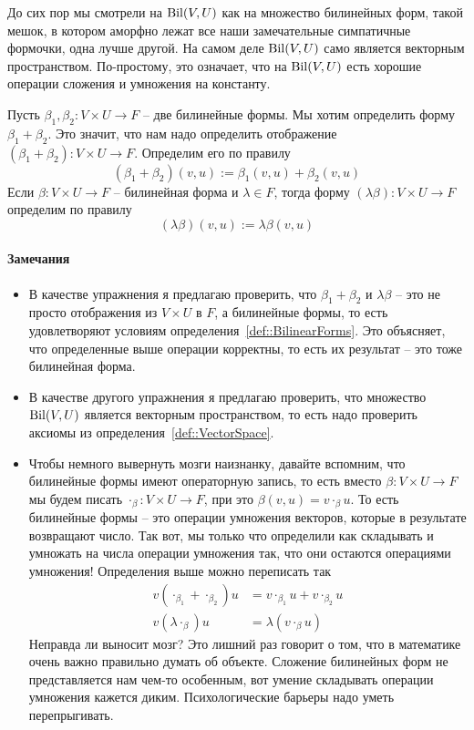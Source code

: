 До сих пор мы смотрели на $\operatorname{Bil}(V, U)$ как на множество билинейных форм, такой мешок, в котором аморфно лежат все наши замечательные симпатичные формочки, одна лучше другой.
На самом деле $\operatorname{Bil}(V, U)$ само является векторным пространством.
По-простому, это означает, что на $\operatorname{Bil}(V, U)$ есть хорошие операции сложения и умножения на константу.


\begin{definition}
Пусть $\beta_1,\beta_2\colon V\times U \to F$ -- две билинейные формы.
Мы хотим определить форму $\beta_1 + \beta_2$.
Это значит, что нам надо определить отображение $(\beta_1 + \beta_2)\colon V\times U \to F$.
Определим его по правилу
\[
(\beta_1 + \beta_2)(v, u) := \beta_1(v,u) + \beta_2(v,u)
\]
Если $\beta\colon V\times U \to F$ -- билинейная форма и $\lambda\in F$, тогда форму $(\lambda \beta)\colon V\times U \to F$ определим по правилу
\[
(\lambda\beta)(v, u) := \lambda \beta(v, u)
\]
\end{definition}

\paragraph{Замечания}

\begin{itemize}
\item В качестве упражнения я предлагаю проверить, что $\beta_1 + \beta_2$ и $\lambda\beta$ -- это не просто отображения из $V\times U$ в $F$, а билинейные формы, то есть удовлетворяют условиям определения~\ref{def::BilinearForms}.
Это объясняет, что определенные выше операции корректны, то есть их результат -- это тоже билинейная форма.

\item В качестве другого упражнения я предлагаю проверить, что множество $\operatorname{Bil}(V, U)$ является векторным пространством, то есть надо проверить аксиомы из определения~\ref{def::VectorSpace}.

\item Чтобы немного вывернуть мозги наизнанку, давайте вспомним, что билинейные формы имеют операторную запись, то есть вместо $\beta\colon V\times U\to F$ мы будем писать $\cdot_\beta\colon V\times U \to F$, при это $\beta(v, u) = v \cdot_\beta u$.
То есть билинейные формы -- это операции умножения векторов, которые в результате возвращают число.
Так вот, мы только что определили как складывать и умножать на числа операции умножения так, что они остаются операциями умножения!
Определения выше можно переписать так
\begin{align*}
v (\cdot_{\beta_1} + \cdot_{\beta_2}) u &= v \cdot_{\beta_1} u + v \cdot_{\beta_2} u\\
v(\lambda \cdot_\beta) u &= \lambda (v \cdot_\beta u)
\end{align*}
Неправда ли выносит мозг?
Это лишний раз говорит о том, что в математике очень важно правильно думать об объекте.
Сложение билинейных форм не представляется нам чем-то особенным, вот умение складывать операции умножения кажется диким.
Психологические барьеры надо уметь перепрыгивать.
\end{itemize}

